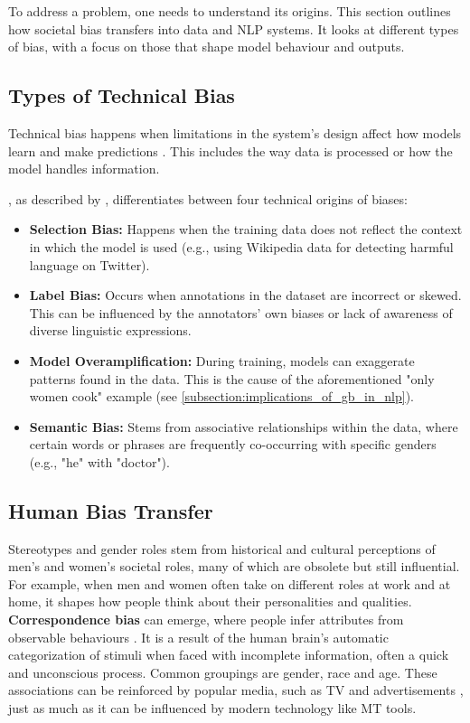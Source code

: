 To address a problem, one needs to understand its origins. This section outlines how societal bias transfers into data and NLP systems. It looks at different types of bias, with a focus on those that shape model behaviour and outputs.

\subsection{Types of Technical Bias}
Technical bias happens when limitations in the system's design affect how models learn and make predictions \citep{stanczakSurveyGenderBias2021}. This includes the way data is processed or how the model handles information.

\citet{shahPredictiveBiasesNatural2020}, as described by \citet{ullmannGenderBiasMachine2022}, differentiates between four technical origins of biases:

\begin{itemize}
    \item \textbf{Selection Bias:} Happens when the training data does not reflect the context in which the model is used (e.g., using Wikipedia data for detecting harmful language on Twitter).
    
    \item \textbf{Label Bias:} Occurs when annotations in the dataset are incorrect or skewed. This can be influenced by the annotators' own biases or lack of awareness of diverse linguistic expressions.

    \item \textbf{Model Overamplification:} During training, models can exaggerate patterns found in the data. This is the cause of the aforementioned "only women cook" example (see \autoref{subsection:implications_of_gb_in_nlp}).

    \item \textbf{Semantic Bias:} Stems from associative relationships within the data, where certain words or phrases are frequently co-occurring with specific genders (e.g., "he" with "doctor").
\end{itemize}

\subsection{Human Bias Transfer}
Stereotypes and gender roles stem from historical and cultural perceptions of men's and women's societal roles, many of which are obsolete but still influential. For example, when men and women often take on different roles at work and at home, it shapes how people think about their personalities and qualities. \textbf{Correspondence bias} can emerge, where people infer attributes from observable behaviours \citep{godsilEffectsGenderRoles2016}. It is a result of the human brain's automatic categorization of stimuli when faced with incomplete information, often a quick and unconscious process. Common groupings are gender, race and age. These associations can be reinforced by popular media, such as TV and advertisements \citep{godsilEffectsGenderRoles2016}, just as much as it can be influenced by modern technology like MT tools. 

